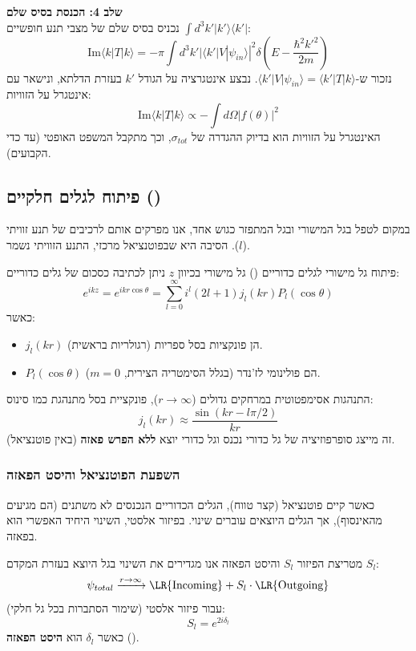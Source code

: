 \textbf{שלב 4: הכנסת בסיס שלם} \\
נכניס בסיס שלם של מצבי תנע חופשיים $\int d^3k' |k'\rangle\langle k'|$:
\[
\text{Im}\langle k|T|k \rangle = -\pi \int d^3k' |\langle k'|V|\psi_{in}\rangle|^2 \delta\left(E - \frac{\hbar^2 k'^2}{2m}\right)
\]
נזכור ש-$\langle k'|V|\psi_{in}\rangle = \langle k'|T|k\rangle$. נבצע אינטגרציה על הגודל $k'$ בעזרת הדלתא, ונישאר עם אינטגרל על הזוויות:
\[
\text{Im}\langle k|T|k \rangle \propto -\int d\Omega |f(\theta)|^2
\]
האינטגרל על הזוויות הוא בדיוק ההגדרה של $\sigma_{tot}$, וכך מתקבל המשפט האופטי (עד כדי הקבועים).


\subsection{פיתוח לגלים חלקיים ()}

במקום לטפל בגל המישורי ובגל המתפזר כגוש אחד, אנו מפרקים אותם לרכיבים של תנע זוויתי ($l$). הסיבה היא שבפוטנציאל מרכזי, התנע הזוויתי נשמר.

\begin{formulabox}{פיתוח גל מישורי לגלים כדוריים ()}
גל מישורי בכיוון $z$ ניתן לכתיבה כסכום של גלים כדוריים:
\[
e^{ikz} = e^{ikr\cos\theta} = \sum_{l=0}^{\infty} i^l (2l+1) j_l(kr) P_l(\cos\theta)
\]
כאשר:
\begin{itemize}
    \item $j_l(kr)$ הן פונקציות בסל ספריות (רגולריות בראשית).
    \item $P_l(\cos\theta)$ הם פולינומי לז'נדר (בגלל הסימטריה הצירית, $m=0$).
\end{itemize}
\end{formulabox}

\begin{notebox}{התנהגות אסימפטוטית}
במרחקים גדולים ($r \to \infty$), פונקציית בסל מתנהגת כמו סינוס:
\[
j_l(kr) \approx \frac{\sin(kr - l\pi/2)}{kr}
\]
זה מייצג סופרפוזיציה של גל כדורי נכנס וגל כדורי יוצא \textbf{ללא הפרש פאזה} (באין פוטנציאל).
\end{notebox}

\subsubsection{השפעת הפוטנציאל והיסט הפאזה }
כאשר קיים פוטנציאל (קצר טווח), הגלים הכדוריים הנכנסים לא משתנים (הם מגיעים מהאינסוף), אך הגלים היוצאים עוברים שינוי. בפיזור אלסטי, השינוי היחיד האפשרי הוא בפאזה.

\begin{definitionbox}{מטריצת הפיזור $S_l$ והיסט הפאזה}
אנו מגדירים את השינוי בגל היוצא בעזרת המקדם $S_l$:
\[
\psi_{total} \xrightarrow{r\to\infty} \text{\LR{Incoming}} + S_l \cdot \text{\LR{Outgoing}}
\]
עבור פיזור אלסטי (שימור הסתברות בכל גל חלקי):
\[
S_l = e^{2i\delta_l}
\]
כאשר $\delta_l$ הוא \textbf{היסט הפאזה} ().
\end{definitionbox}


